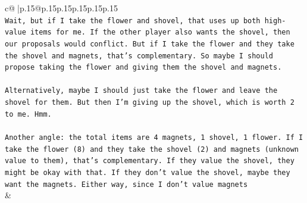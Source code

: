 \documentclass{article}
\begin{document}
{\begin{supertabular}{c@{$\;$}|p{.15\linewidth}@{}p{.15\linewidth}p{.15\linewidth}p{.15\linewidth}p{.15\linewidth}p{.15\linewidth}}
{{{\\ 
\texttt{Wait, but if I take the flower and shovel, that uses up both high{-}value items for me. If the other player also wants the shovel, then our proposals would conflict. But if I take the flower and they take the shovel and magnets, that's complementary. So maybe I should propose taking the flower and giving them the shovel and magnets. } \\
\\ 
\texttt{Alternatively, maybe I should just take the flower and leave the shovel for them. But then I'm giving up the shovel, which is worth 2 to me. Hmm. } \\
\\ 
\texttt{Another angle: the total items are 4 magnets, 1 shovel, 1 flower. If I take the flower (8) and they take the shovel (2) and magnets (unknown value to them), that's complementary. If they value the shovel, they might be okay with that. If they don't value the shovel, maybe they want the magnets. Either way, since I don't value magnets} \\
            }
        }
    }
    & \\ \\


\end{supertabular}}
\end{document}
